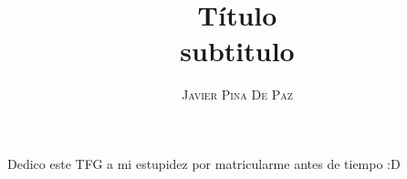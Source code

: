 \documentclass[a4paper,11pt]{book}
\title{\Huge \textbf{T\'itulo }   \\ \huge subtitulo}
\author{\textsc{Javier Pina De Paz}} %
\begin{document}
\frontmatter
\maketitle

\begin{dedication}
Dedico este TFG a mi estupidez por matricularme antes de tiempo :D
\end{dedication}

\tableofcontents

\mainmatter  %







\end{document}
